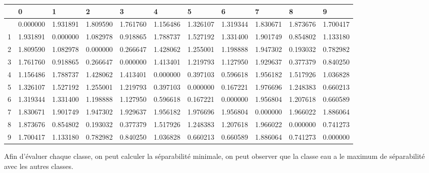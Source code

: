 \documentclass[
]{article}
\begin{document}
\begin{longtable}[]{@{}lllllllllll@{}}
\toprule\noalign{}
& 0 & 1 & 2 & 3 & 4 & 5 & 6 & 7 & 8 & 9 \\
\midrule\noalign{}
\endhead
\bottomrule\noalign{}
\endlastfoot
0 & 0.000000 & 1.931891 & 1.809590 & 1.761760 & 1.156486 & 1.326107 &
1.319344 & 1.830671 & 1.873676 & 1.700417 \\
1 & 1.931891 & 0.000000 & 1.082978 & 0.918865 & 1.788737 & 1.527192 &
1.331400 & 1.901749 & 0.854802 & 1.133180 \\
2 & 1.809590 & 1.082978 & 0.000000 & 0.266647 & 1.428062 & 1.255001 &
1.198888 & 1.947302 & 0.193032 & 0.782982 \\
3 & 1.761760 & 0.918865 & 0.266647 & 0.000000 & 1.413401 & 1.219793 &
1.127950 & 1.929637 & 0.377379 & 0.840250 \\
4 & 1.156486 & 1.788737 & 1.428062 & 1.413401 & 0.000000 & 0.397103 &
0.596618 & 1.956182 & 1.517926 & 1.036828 \\
5 & 1.326107 & 1.527192 & 1.255001 & 1.219793 & 0.397103 & 0.000000 &
0.167221 & 1.976696 & 1.248383 & 0.660213 \\
6 & 1.319344 & 1.331400 & 1.198888 & 1.127950 & 0.596618 & 0.167221 &
0.000000 & 1.956804 & 1.207618 & 0.660589 \\
7 & 1.830671 & 1.901749 & 1.947302 & 1.929637 & 1.956182 & 1.976696 &
1.956804 & 0.000000 & 1.966022 & 1.886064 \\
8 & 1.873676 & 0.854802 & 0.193032 & 0.377379 & 1.517926 & 1.248383 &
1.207618 & 1.966022 & 0.000000 & 0.741273 \\
9 & 1.700417 & 1.133180 & 0.782982 & 0.840250 & 1.036828 & 0.660213 &
0.660589 & 1.886064 & 0.741273 & 0.000000 \\
\end{longtable}

Afin d'évaluer chaque classe, on peut calculer la séparabilité minimale,
on peut observer que la classe eau a le maximum de séparabilité avec les
autres classes.
\end{document}

